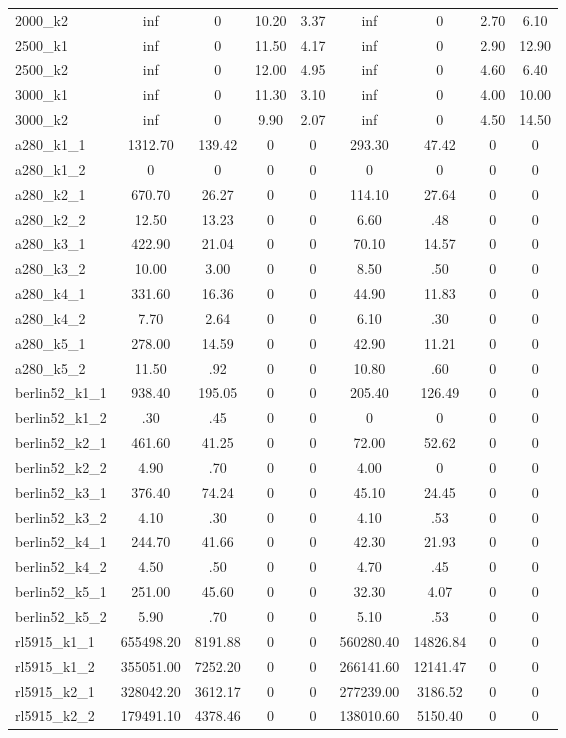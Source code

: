 \documentclass{article}
\begin{document}
\begin{center}
\begin{tabular}{|l|c|c|c|c|c|c|c|c|}
2000\_k2 & inf & 0 & 10.20 & 3.37 & inf & 0 & 2.70 & 6.10\\
2500\_k1 & inf & 0 & 11.50 & 4.17 & inf & 0 & 2.90 & 12.90\\
2500\_k2 & inf & 0 & 12.00 & 4.95 & inf & 0 & 4.60 & 6.40\\
3000\_k1 & inf & 0 & 11.30 & 3.10 & inf & 0 & 4.00 & 10.00\\
3000\_k2 & inf & 0 & 9.90 & 2.07 & inf & 0 & 4.50 & 14.50\\
a280\_k1\_1 & 1312.70 & 139.42 & 0 & 0 & 293.30 & 47.42 & 0 & 0\\
a280\_k1\_2 & 0 & 0 & 0 & 0 & 0 & 0 & 0 & 0\\
a280\_k2\_1 & 670.70 & 26.27 & 0 & 0 & 114.10 & 27.64 & 0 & 0\\
a280\_k2\_2 & 12.50 & 13.23 & 0 & 0 & 6.60 & .48 & 0 & 0\\
a280\_k3\_1 & 422.90 & 21.04 & 0 & 0 & 70.10 & 14.57 & 0 & 0\\
a280\_k3\_2 & 10.00 & 3.00 & 0 & 0 & 8.50 & .50 & 0 & 0\\
a280\_k4\_1 & 331.60 & 16.36 & 0 & 0 & 44.90 & 11.83 & 0 & 0\\
a280\_k4\_2 & 7.70 & 2.64 & 0 & 0 & 6.10 & .30 & 0 & 0\\
a280\_k5\_1 & 278.00 & 14.59 & 0 & 0 & 42.90 & 11.21 & 0 & 0\\
a280\_k5\_2 & 11.50 & .92 & 0 & 0 & 10.80 & .60 & 0 & 0\\
berlin52\_k1\_1 & 938.40 & 195.05 & 0 & 0 & 205.40 & 126.49 & 0 & 0\\
berlin52\_k1\_2 & .30 & .45 & 0 & 0 & 0 & 0 & 0 & 0\\
berlin52\_k2\_1 & 461.60 & 41.25 & 0 & 0 & 72.00 & 52.62 & 0 & 0\\
berlin52\_k2\_2 & 4.90 & .70 & 0 & 0 & 4.00 & 0 & 0 & 0\\
berlin52\_k3\_1 & 376.40 & 74.24 & 0 & 0 & 45.10 & 24.45 & 0 & 0\\
berlin52\_k3\_2 & 4.10 & .30 & 0 & 0 & 4.10 & .53 & 0 & 0\\
berlin52\_k4\_1 & 244.70 & 41.66 & 0 & 0 & 42.30 & 21.93 & 0 & 0\\
berlin52\_k4\_2 & 4.50 & .50 & 0 & 0 & 4.70 & .45 & 0 & 0\\
berlin52\_k5\_1 & 251.00 & 45.60 & 0 & 0 & 32.30 & 4.07 & 0 & 0\\
berlin52\_k5\_2 & 5.90 & .70 & 0 & 0 & 5.10 & .53 & 0 & 0\\
rl5915\_k1\_1 & 655498.20 & 8191.88 & 0 & 0 & 560280.40 & 14826.84 & 0 & 0\\
rl5915\_k1\_2 & 355051.00 & 7252.20 & 0 & 0 & 266141.60 & 12141.47 & 0 & 0\\
rl5915\_k2\_1 & 328042.20 & 3612.17 & 0 & 0 & 277239.00 & 3186.52 & 0 & 0\\
rl5915\_k2\_2 & 179491.10 & 4378.46 & 0 & 0 & 138010.60 & 5150.40 & 0 & 0\\

\hline
\end{tabular}
\end{center}
\end{document}
